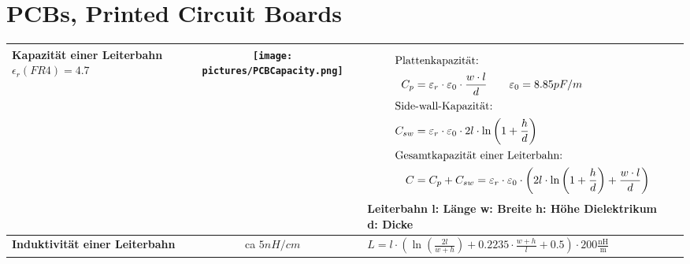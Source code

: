 \section{PCBs, Printed Circuit Boards}

\begin{longtable}{|>{\bfseries}p{3cm}|c|p{11.2cm}|}
    \hline
    Kapazität \newline einer Leiterbahn\newline $\epsilon_r(FR4) = 4.7$
    & \texttt{[image: pictures/PCBCapacity.png]}
    & {\vspace{-1.8\topsep}
        \begin{align*}
            \intertext{Plattenkapazität:}
            C_p &= \varepsilon_{r}\cdot \varepsilon_{0}\cdot \frac{w\cdot l}{d} \qquad \varepsilon_{0}= 8.85 pF/m\\
            \intertext{Side-wall-Kapazität:}
            C_{sw} &= \varepsilon_{r}\cdot \varepsilon_{0}\cdot 2l \cdot \ln\left( 1 + \frac{h}{d}\right) \\
            \intertext{Gesamtkapazität einer Leiterbahn:}
            C &= C_p + C_{sw} = \varepsilon_{r}\cdot \varepsilon_{0}\cdot \left( 2l \cdot \ln\left( 1 + \frac{h}{d}\right) + \frac{w\cdot l}{d}\right) 
        \end{align*}
        \newline
        Leiterbahn \qquad l: Länge \qquad w: Breite \qquad h: Höhe\newline
        Dielektrikum $\;\;$ d: Dicke
    }
    \\ \hline
    Induktivität \newline einer Leiterbahn
    & ca $5nH / cm$
    & {%
       $L = l \cdot\left( \ln\left( \frac{2l}{w + h}\right)  + 0.2235 \cdot \frac{w + h}{l} + 0.5\right)  \cdot 200\frac{\mathrm{nH}}{\mathrm{m}}$
       \newline 
      }
    \\ \hline
\end{longtable}